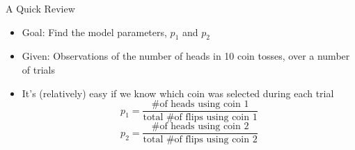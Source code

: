 \documentclass[aspectratio=169]{beamer}
\begin{document}
\begin{frame}[fragile]{A Quick Review}
        \begin{itemize}
	\item Goal: Find the model parameters, $p_1$ and $p_2$
	\item Given: Observations of the number of heads in 10 coin tosses, over a number of trials	
	\item It's (relatively) easy if we know which coin was selected during each trial
	$$p_1 = \frac{\textrm{\# of heads using coin 1}}{\textrm{total \# of flips using coin 1}}$$
	$$p_2 = \frac{\textrm{\# of heads using coin 2}}{\textrm{total \# of flips using coin 2}}$$
	\end{itemize}
\end{frame}
\end{document}
